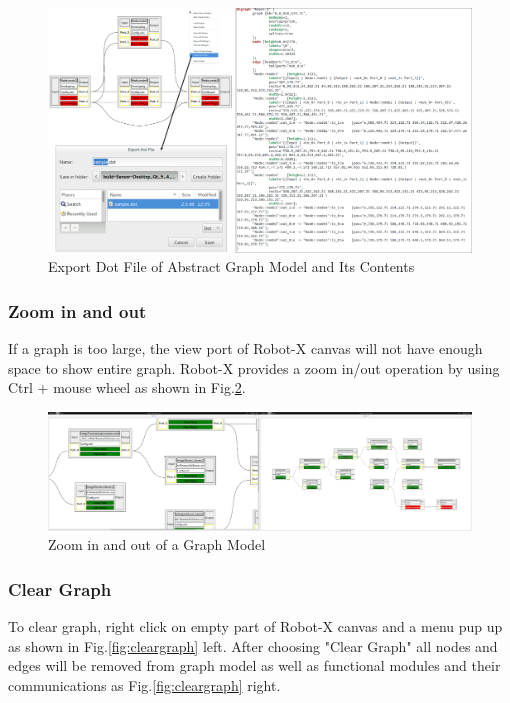 \documentclass[a4paper,10pt]{book}
\begin{document}
\begin{figure}
 \centering
 \includegraphics[width=1.0\textwidth]{img/exportdot.eps}
 \caption{Export Dot File of Abstract Graph Model and Its Contents}
 \label{fig:exportdot}
\end{figure}

\subsubsection{Zoom in and out}

If a graph is too large, the view port of Robot-X canvas will not have enough space to show entire graph. Robot-X provides a zoom in/out operation by using Ctrl + mouse wheel as shown in Fig.\ref{fig:zoom}.

\begin{figure}
 \centering
 \includegraphics[width=1.0\textwidth]{img/zoom.eps}
 \caption{Zoom in and out of a Graph Model}
 \label{fig:zoom}
\end{figure}

\subsubsection{Clear Graph}

To clear graph, right click on empty part of Robot-X canvas and a menu pup up as shown in Fig.\ref{fig:cleargraph} left. After choosing "Clear Graph" all nodes and edges will be removed from graph model as well as functional modules and their communications as Fig.\ref{fig:cleargraph} right.
\end{document}

